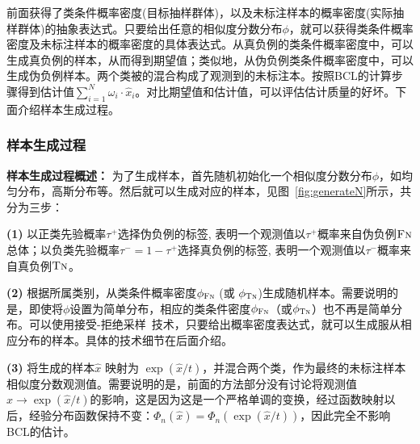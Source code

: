 前面获得了类条件概率密度(目标抽样群体)，以及未标注样本的概率密度(实际抽样群体)的抽象表达式。只要给出任意的相似度分数分布$\phi$，就可以获得类条件概率密度及未标注样本的概率密度的具体表达式。从真负例的类条件概率密度中，可以生成真负例的样本，从而得到期望值；类似地，从伪负例类条件概率密度中，可以生成伪负例样本。两个类被的混合构成了观测到的未标注本。按照BCL的计算步骤得到估计值$\sum_{i=1}^N \omega_i \cdot \hat{x}_i$。对比期望值和估计值，可以评估估计质量的好坏。下面介绍样本生成过程。

\subsubsection{样本生成过程}
\textbf{样本生成过程概述：}
为了生成样本，首先随机初始化一个相似度分数分布$\phi$，如均匀分布，高斯分布等。然后就可以生成对应的样本，见图~\ref{fig:generateN}所示，共分为三步：
\par
\textbf{(1)} 以正类先验概率$\tau^+$选择伪负例的标签, 表明一个观测值以$\tau^+$概率来自伪负例$\textsc{Fn}$总体；以负类先验概率$\tau^-=1-\tau^+$选择真负例的标签, 表明一个观测值以$\tau^-$概率来自真负例$\textsc{Tn}$。

\par
\textbf{(2)} 根据所属类别，从类条件概率密度$\phi_{\textsc{Fn}}$ (或 $\phi_{\textsc{Tn}}$)生成随机样本。需要说明的是，即使将$\phi$设置为简单分布，相应的类条件密度$\phi_{\textsc{Fn}}$（或$\phi_{\textsc{Tn}}$）也不再是简单分布。可以使用接受-拒绝采样~\cite{casella2004generalized}技术，只要给出概率密度表达式，就可以生成服从相应分布的样本。具体的技术细节在后面介绍。
\par
\textbf{(3)} 将生成的样本$\hat{x}$ 映射为 $\exp(\hat{x}/t)$，并混合两个类，作为最终的未标注样本相似度分数观测值。需要说明的是，前面的方法部分没有讨论将观测值$\hat{x}\rightarrow \exp(\hat{x}/t)$的影响，这是因为这是一个严格单调的变换，经过函数映射以后，经验分布函数保持不变：$\Phi_n(\hat{x}) = \Phi_n(\exp(\hat{x}/t))$，因此完全不影响BCL的估计。

